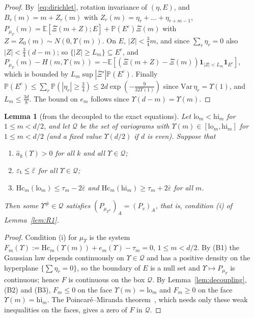 \documentclass[11pt]{amsart}
\newtheorem{lemma}[theorem]{Lemma}
\theoremstyle{definition}
\theoremstyle{remark}
\numberwithin{equation}{section}
\newcommand{\E}{\mathbb{E}}
\renewcommand{\Pr}{\mathbb{P}}
\newcommand{\one}{\mathbf{1}}
\newcommand{\Xb}{\overline{\Xi}}
\begin{document}
\begin{proof}
By~\eqref{eq:dirichlet}, rotation invariance of $(\eta,E)$, and $B_r(m)=m+Z_r(m)$ with $Z_r(m)=\eta_r+\dots+\eta_{r+m-1}$,
$P_{\mu_\Upsilon}(m)=\E[\Xb(m+Z);E]+\Pr(E^c)\Xb(m)$ with $Z=Z_0(m)\sim N(0,\Upsilon(m))$. On $E$, $|Z|<\frac34m$, and since
$\sum_r\eta_r=0$ also $|Z|<\frac34(d-m)$; so $\{|Z|\ge L_m\}\subseteq E^c$, and
$P_{\mu_\Upsilon}(m)-H(m,\Upsilon(m))=-\E[(\Xb(m+Z)-\Xb(m))\one_{|Z|<L_m}\one_{E^c}]$, which is bounded by $L_m\sup|\Xb'|\Pr(E^c)$.
Finally $\Pr(E^c)\le\sum_r\Pr(|\eta_r|\ge\frac34)\le2d\exp(-\frac9{32\Upsilon(1)})$ since $\mathrm{Var}\,\eta_r=\Upsilon(1)$, and
$L_m\le\frac{3d}8$. The bound on $e_m$ follows since $\Upsilon(d-m)=\Upsilon(m)$.
\end{proof}

\begin{lemma}[from the decoupled to the exact equations]\label{lem:B}
Let $\mathrm{lo}_m<\mathrm{hi}_m$ for $1\le m<d/2$, and let $\mathcal Q$ be the set of variograms with
$\Upsilon(m)\in[\mathrm{lo}_m,\mathrm{hi}_m]$ for $1\le m<d/2$ (and a fixed value $\Upsilon(d/2)$ if $d$ is even). Suppose that
\begin{enumerate}
\item[(B1)] $\hat a_k(\Upsilon)>0$ for all $k$ and all $\Upsilon\in\mathcal Q$;
\item[(B2)] $\varepsilon_{\rm t}\le\bar\varepsilon$ for all $\Upsilon\in\mathcal Q$;
\item[(B3)] $\mathrm{Hc}_m(\mathrm{lo}_m)\le\tau_m-2\bar\varepsilon$ and $\mathrm{Hc}_m(\mathrm{hi}_m)\ge\tau_m+2\bar\varepsilon$ for all $m$.
\end{enumerate}
Then some $\Upsilon^\#\in\mathcal Q$ satisfies $(P_{\mu_{\Upsilon^\#}})_A=(P_v)_A$, that is, condition (i) of Lemma~\ref{lem:R1}.
\end{lemma}

\begin{proof}
Condition (i) for $\mu_\Upsilon$ is the system $F_m(\Upsilon):=\mathrm{Hc}_m(\Upsilon(m))+e_m(\Upsilon)-\tau_m=0$, $1\le m<d/2$. By (B1)
the Gaussian law depends continuously on $\Upsilon\in\mathcal Q$ and has a positive density on the hyperplane
$\{\sum\eta_r=0\}$, so the boundary of $E$ is a null set and $\Upsilon\mapsto P_{\mu_\Upsilon}$ is continuous; hence $F$ is continuous on
the box $\mathcal Q$. By Lemma~\ref{lem:decoupling}, (B2) and (B3), $F_m\le0$ on the face $\Upsilon(m)=\mathrm{lo}_m$ and $F_m\ge0$ on the
face $\Upsilon(m)=\mathrm{hi}_m$. The Poincar\'e--Miranda theorem~\cite{Kulpa}, which needs only these weak inequalities on the
faces, gives a zero of $F$ in $\mathcal Q$.
\end{proof}
\end{document}
